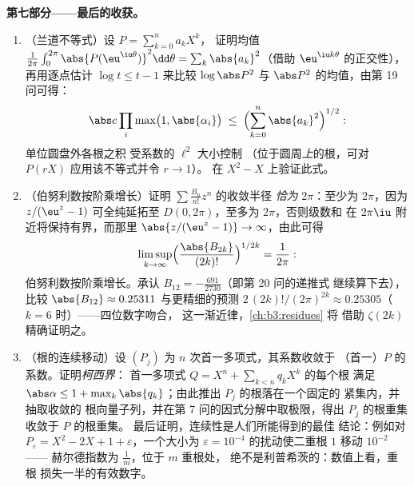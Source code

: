 \begin{problem}
\medskip
\noindent\textbf{第七部分——最后的收获。}
\begin{enumerate}[resume]
  \item （兰道不等式）设 $P = \sum_{k=0}^na_kX^k$，
        证明均值 $\frac1{2\pi}\int_0^{2\pi}
        \abs{P(\eu^{\iu\theta})}^2\dd\theta =
        \sum_k\abs{a_k}^2$（借助
        $\eu^{\iu k\theta}$ 的正交性），再用逐点估计
        $\log t \leq t - 1$ 来比较
        $\log\abs P^2$ 与 $\abs P^2$ 的均值，由第
        19 问可得：
        \[
        \abs c\prod_{i}\max\bigl(1, \abs{\alpha_i}\bigr)
        \;\leq\;
        \Bigl(\sum_{k=0}^{n}\abs{a_k}^2\Bigr)^{1/2} :
        \]
        单位圆盘外各根之积
        受系数的 $\ell^2$ 大小控制
        （位于圆周\emph{上}的根，可对
        $P(rX)$ 应用该不等式并令 $r \to 1$）。
        在 $X^2 - X$ 上验证此式。
  \item （伯努利数按阶乘增长）证明
        $\sum\frac{B_n}{n!}z^n$ 的收敛半径
        \emph{恰为} $2\pi$：至少为 $2\pi$，因为
        $z/(\eu^z - 1)$ 可全纯延拓至
        $D(0, 2\pi)$，至多为 $2\pi$，否则级数和
        在 $2\pi\iu$ 附近将保持有界，而那里
        $\abs{z/(\eu^z-1)} \to \infty$，由此可得
        \[
        \limsup_{k\to\infty}
        \Bigl(\frac{\abs{B_{2k}}}{(2k)!}\Bigr)^{1/2k}
        = \frac1{2\pi} :
        \]
        伯努利数按阶乘增长。承认 $B_{12}
        = -\frac{691}{2730}$（即第 20 问的递推式
        继续算下去），比较 $\abs{B_{12}} \approx 0.25311$
        与更精细的预测 $2\,(2k)!/(2\pi)^{2k}
        \approx 0.25305$（$k = 6$ 时）——四位数字吻合，
        这一渐近律，\cref{ch:b3:residues} 将
        借助 $\zeta(2k)$ 精确证明之。
  \item （根的连续移动）设 $(P_j)$ 为
        $n$ 次首一多项式，其系数收敛于
        （首一）$P$ 的系数。证明\emph{柯西界}：
        首一多项式 $Q = X^n + \sum_{k<n}q_kX^k$ 的每个根
        满足 $\abs\alpha \leq 1 + \max_k\abs{q_k}$；由此推出
        $P_j$ 的根落在一个固定的
        紧集内，并抽取收敛的
        根向量子列，并在第
        7 问的因式分解中取极限，得出
        $P_j$ 的根重集收敛于 $P$ 的根重集。
        最后证明，连续性是人们所能得到的最佳
        结论：例如对 $P_\varepsilon = X^2 - 2X + 1 +
        \varepsilon$，一个大小为 $\varepsilon =
        10^{-4}$ 的扰动使二重根 $1$ 移动 $10^{-2}$ ——
        赫尔德指数为 $\frac1m$，位于 $m$ 重根处，
        绝不是利普希茨的：数值上看，重根
        损失一半的有效数字。
\end{enumerate}
\end{problem}
